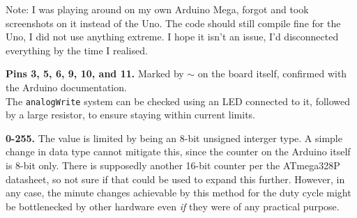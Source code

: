 Note: I was playing around on my own Arduino Mega, forgot and took 
screenshots on it instead of the Uno. The code should still compile
fine for the Uno, I did not use anything extreme. I hope it isn't an 
issue, I'd disconnected everything by the time I realised.


\begin{arabicparts}
    \questionpart
    \textbf{{Pins 3, 5, 6, 9, 10, and 11}.} Marked by $\sim$ on the board itself,
    confirmed with the Arduino documentation.\\
    The \texttt{analogWrite} system can be checked using an LED connected
    to it, followed by a large resistor, to ensure staying within current limits.

    \questionpart
    \textbf{0-255.} The value is limited by being an 8-bit unsigned interger type. A simple
    change in data type cannot mitigate this, since the counter on the Arduino itself
    is 8-bit only. There is supposedly another 16-bit counter per the ATmega328P datasheet,
    so not sure if that could be used to expand this further. However, in any case, the minute
    changes achievable by this method for the duty cycle might be bottlenecked by other
    hardware even \emph{if} they were of any practical purpose.


\end{arabicparts}
